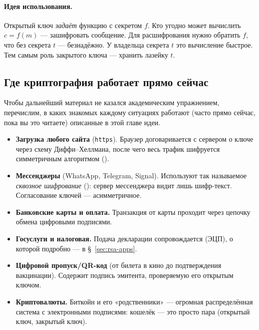 \paragraph*{Идея использования.} Открытый ключ \emph{задаёт} функцию с секретом $f$. Кто угодно может вычислить $c = f(m)$ --- зашифровать сообщение. Для расшифрования нужно обратить $f$, что без секрета $t$ --- безнадёжно. У владельца секрета $t$ это вычисление быстрое. Тем самым роль закрытого ключа --- хранить лазейку $t$.

\subsection{Где криптография работает прямо сейчас}

Чтобы дальнейший материал не казался академическим упражнением, перечислим, в каких знакомых каждому ситуациях работают (часто прямо сейчас, пока вы это читаете) описанные в этой главе идеи.

\begin{itemize}
  \item \textbf{Загрузка любого сайта} (\texttt{https}). Браузер договаривается с сервером о ключе через схему Диффи--Хеллмана, после чего весь трафик шифруется симметричным алгоритмом ().
  \item \textbf{Мессенджеры} (WhatsApp, Telegram, Signal). Используют так называемое \emph{сквозное шифрование} (): сервер мессенджера видит лишь шифр-текст. Согласование ключей --- асимметричное.
  \item \textbf{Банковские карты и оплата.} Транзакция от карты проходит через цепочку обмена цифровыми подписями.
  \item \textbf{Госуслуги и налоговая.} Подача декларации сопровождается  (ЭЦП), о которой подробно --- в §~\ref{sec:rsa-apps}.
  \item \textbf{Цифровой пропуск/QR-код} (от билета в кино до подтверждения вакцинации). Содержит подпись эмитента, проверяемую его открытым ключом.
  \item \textbf{Криптовалюты.} Биткойн и его «родственники» --- огромная распределённая система с электронными подписями: кошелёк --- это просто пара (открытый ключ, закрытый ключ).
\end{itemize}

